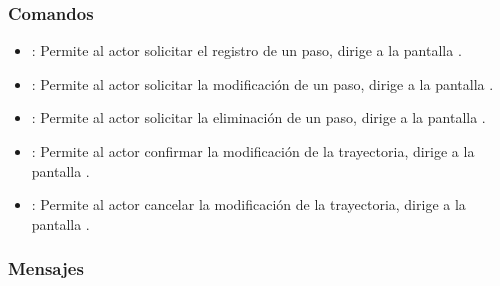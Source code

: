 \subsubsection{Comandos}
\begin{itemize}
	\item {}: Permite al actor solicitar el registro de un paso, dirige a la pantalla .
	\item \btnEditar[Modificar]: Permite al actor solicitar la modificación de un paso, dirige a la pantalla .
	\item \btnEliminar[Eliminar]: Permite al actor solicitar la eliminación de un paso, dirige a la pantalla .
	\item {}: Permite al actor confirmar la modificación de la trayectoria, dirige a la pantalla .
	\item {}: Permite al actor cancelar la modificación de la trayectoria, dirige a la pantalla .
\end{itemize}

\subsubsection{Mensajes}

